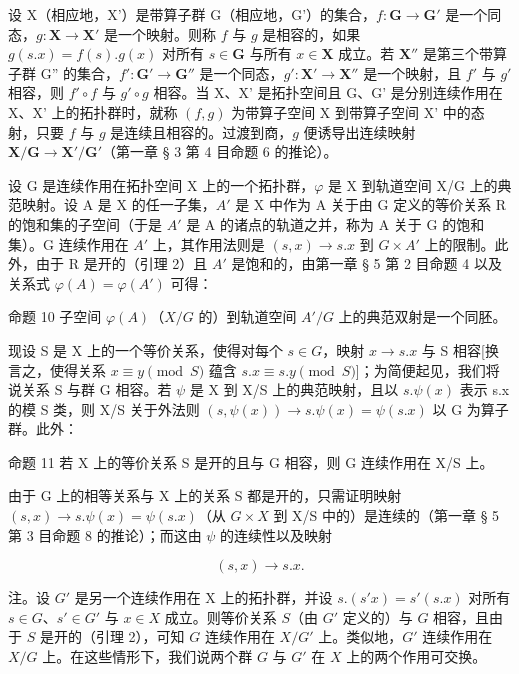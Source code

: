 设 X（相应地，X'）是带算子群 G（相应地，G'）的集合，\(f: \mathbf{G} \to \mathbf{G}'\) 是一个同态，\(g: \mathbf{X} \to \mathbf{X}'\) 是一个映射。则称 \(f\) 与 \(g\) 是相容的，如果 \(g(s.x) = f(s).g(x)\) 对所有 \(s \in \mathbf{G}\) 与所有 \(x \in \mathbf{X}\) 成立。若 \(\mathbf{X}''\) 是第三个带算子群 G'' 的集合，\(f': \mathbf{G}' \to \mathbf{G}''\) 是一个同态，\(g': \mathbf{X}' \to \mathbf{X}''\) 是一个映射，且 \(f'\) 与 \(g'\) 相容，则 \(f' \circ f\) 与 \(g' \circ g\) 相容。当 X、X' 是拓扑空间且 G、G' 是分别连续作用在 X、X' 上的拓扑群时，就称 \((f, g)\) 为带算子空间 X 到带算子空间 X' 中的态射，只要 \(f\) 与 \(g\) 是连续且相容的。过渡到商，\(g\) 便诱导出连续映射 \(\mathbf{X}/\mathbf{G} \to \mathbf{X}'/\mathbf{G}'\)（第一章 § 3 第 4 目命题 6 的推论）。

设 G 是连续作用在拓扑空间 X 上的一个拓扑群，\(\varphi\) 是 X 到轨道空间 X/G 上的典范映射。设 A 是 X 的任一子集，\(A'\) 是 X 中作为 A 关于由 G 定义的等价关系 R 的饱和集的子空间（于是 \(A'\) 是 A 的诸点的轨道之并，称为 A 关于 G 的饱和集）。G 连续作用在 \(A'\) 上，其作用法则是 \((s, x) \to s.x\) 到 \(G \times A'\) 上的限制。此外，由于 R 是开的（引理 2）且 \(A'\) 是饱和的，由第一章 § 5 第 2 目命题 4 以及关系式 \(\varphi(A) = \varphi(A')\) 可得：

命题 10 子空间 \(\varphi(A)\)（\(X/G\) 的）到轨道空间 \(A'/G\) 上的典范双射是一个同胚。

现设 S 是 X 上的一个等价关系，使得对每个 \(s \in G\)，映射 \(x \to s.x\) 与 S 相容{[}换言之，使得关系 \(x \equiv y \pmod{S}\) 蕴含 \(s.x \equiv s.y \pmod{S}\){]}；为简便起见，我们将说关系 S 与群 G 相容。若 \(\psi\) 是 X 到 X/S 上的典范映射，且以 \(s.\psi(x)\) 表示 s.x 的模 S 类，则 X/S 关于外法则 \((s, \psi(x)) \to s.\psi(x) = \psi(s.x)\) 以 G 为算子群。此外：

命题 11 若 X 上的等价关系 S 是开的且与 G 相容，则 G 连续作用在 X/S 上。

由于 G 上的相等关系与 X 上的关系 S 都是开的，只需证明映射 \((s,x)\to s.\psi(x)=\psi(s.x)\)（从 \(G\times X\) 到 X/S 中的）是连续的（第一章 § 5 第 3 目命题 8 的推论）；而这由 \(\psi\) 的连续性以及映射

\[
(s, x) \rightarrow s. x.
\]

注。设 \(G'\) 是另一个连续作用在 X 上的拓扑群，并设 \(s.(s'x) = s'(s.x)\) 对所有 \(s \in G\)、\(s' \in G'\) 与 \(x \in X\) 成立。则等价关系 \(S\)（由 \(G'\) 定义的）与 \(G\) 相容，且由于 \(S\) 是开的（引理 2），可知 \(G\) 连续作用在 \(X/G'\) 上。类似地，\(G'\) 连续作用在 \(X/G\) 上。在这些情形下，我们说两个群 \(G\) 与 \(G'\) 在 \(X\) 上的两个作用可交换。

